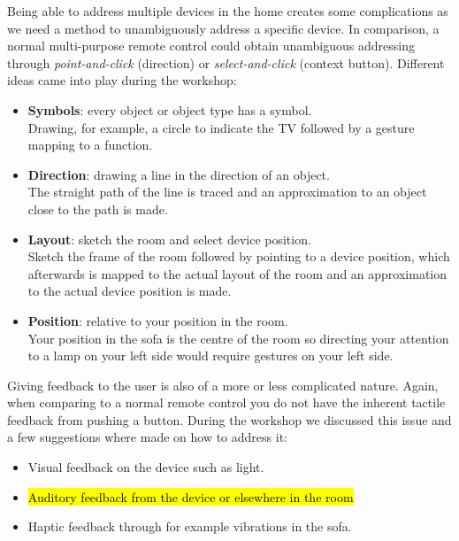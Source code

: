 Being able to address multiple devices in the home creates some complications as we need a method to unambiguously address a specific device.
In comparison, a normal multi-purpose remote control could obtain unambiguous addressing through \emph{point-and-click} (direction) or \emph{select-and-click} (context button).
Different ideas came into play during the workshop: 

\begin{itemize}
  \item{\textbf{Symbols}: every object or object type has a symbol.\\
        Drawing, for example, a circle to indicate the TV followed by a gesture mapping to a function.
  }
  \item{\textbf{Direction}: drawing a line in the direction of an object.\\
        The straight path of the line is traced and an approximation to an object close to the path is made.
  }
  \item{\textbf{Layout}: sketch the room and select device position.\\
        Sketch the frame of the room followed by pointing to a device position, which afterwards is mapped to the actual layout of the room and an approximation to the actual device position is made.
  }
  \item{\textbf{Position}: relative to your position in the room.\\
        Your position in the sofa is the centre of the room so directing your attention to a lamp on your left side would require gestures on your left side.
  }
\end{itemize}

Giving feedback to the user is also of a more or less complicated nature.
Again, when comparing to a normal remote control you do not have the inherent tactile feedback from pushing a button.
During the workshop we discussed this issue and a few suggestions where made on how to address it:
\begin{itemize}
  \item{Visual feedback on the device such as light.}
  \item{\hl{Auditory feedback from the device or elsewhere in the room} }
  \item{Haptic feedback through for example vibrations in the sofa.}
\end{itemize}

